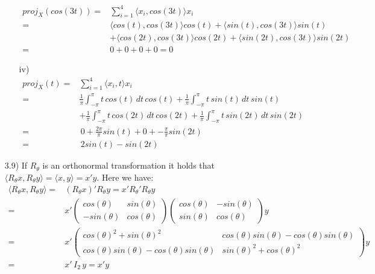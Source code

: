 \documentclass[letterpaper,12pt]{article}
\theoremstyle{definition}
\begin{document}
\begin{enumerate}
\begin{itemize}
\begin{align*}
proj_X(cos(3t)) =& \sum_{i=1}^4 \langle x_i, cos(3t)\rangle x_i \\
 =& \langle cos(t), cos(3t)\rangle cos(t) + \langle sin(t), cos(3t)\rangle sin(t) \\
\quad & + \langle cos(2t), cos(3t)\rangle cos(2t) + \langle sin(2t), cos(3t)\rangle sin(2t) \\
=& 0 + 0 +0 +0 = 0
\end{align*}
\item[iv)]
\begin{align*}
proj_X(t)=& \sum_{i=1}^4 \langle x_i, t \rangle x_i\\
 =& \frac{1}{\pi}\int_{-\pi}^{\pi} t\, cos(t)\, dt\, cos(t) +\frac{1}{\pi} \int_{-\pi}^{\pi} t\, sin(t)\, dt \,sin(t) \\
 \quad &+ \frac{1}{\pi}\int_{-\pi}^{\pi} t \,cos(2t)\, dt\, cos(2t)  + \frac{1}{\pi}\int_{-\pi}^{\pi} t\, sin(2t)\, dt\, sin(2t) \\
 =& \, 0 + \frac{2\pi}{\pi} sin(t) + 0 + -\frac{\pi}{\pi} sin(2t)\\
 =&\, 2sin(t)-sin(2t)
\end{align*}
\end{itemize}
\item[3.9)]If $R_{\theta}$ is an orthonormal transformation it holds that $\langle R_{\theta}x, R_{\theta}y \rangle = \langle x, y\rangle = x'y $.
Here we have: \begin{align*}
\langle R_{\theta}x, R_{\theta}y \rangle =&( R_{\theta}x)' R_{\theta}y=x'R_{\theta}' R_{\theta}y \\
=& x'\begin{pmatrix}
cos(\theta)&sin(\theta)\\-sin(\theta)&cos(\theta)
\end{pmatrix}\begin{pmatrix}
cos(\theta)&-sin(\theta)\\sin(\theta)&cos(\theta)
\end{pmatrix}y \\
=&x'\begin{pmatrix}
cos(\theta)^2+sin(\theta)^2& cos(\theta)sin(\theta) - cos(\theta)sin(\theta)\\
cos(\theta)sin(\theta)- cos(\theta)sin(\theta)&sin(\theta)^2 +cos(\theta)^2
\end{pmatrix}y\\
 =& x'\, I_2\, y=x'y
\end{align*} 


\end{enumerate}
\end{document}
